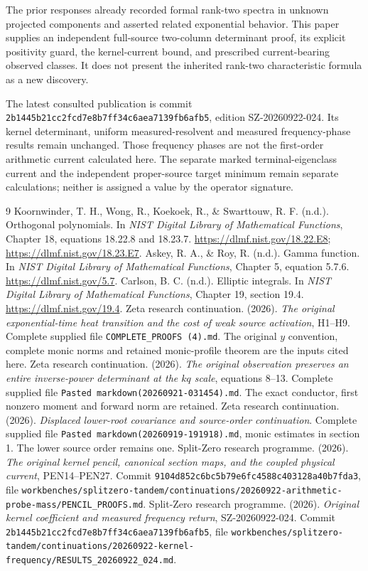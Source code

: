 \documentclass[11pt]{article}
\begin{document}
The prior responses already recorded formal rank-two spectra in unknown projected components and asserted related exponential behavior. This paper supplies an independent full-source two-column determinant proof, its explicit positivity guard, the kernel-current bound, and prescribed current-bearing observed classes. It does not present the inherited rank-two characteristic formula as a new discovery.

The latest consulted publication is commit \nolinkurl{2b1445b21cc2fcd7e8b7ff34c6aea7139fb6afb5}, edition SZ-20260922-024. Its kernel determinant, uniform measured-resolvent and measured frequency-phase results remain unchanged. Those frequency phases are not the first-order arithmetic current calculated here. The separate marked terminal-eigenclass current and the independent proper-source target minimum remain separate calculations; neither is assigned a value by the operator signature.

\begin{thebibliography}{9}
 Koornwinder, T. H., Wong, R., Koekoek, R., \& Swarttouw, R. F. (n.d.). Orthogonal polynomials. In \emph{NIST Digital Library of Mathematical Functions}, Chapter 18, equations 18.22.8 and 18.23.7. \url{https://dlmf.nist.gov/18.22.E8}; \url{https://dlmf.nist.gov/18.23.E7}.
 Askey, R. A., \& Roy, R. (n.d.). Gamma function. In \emph{NIST Digital Library of Mathematical Functions}, Chapter 5, equation 5.7.6. \url{https://dlmf.nist.gov/5.7}.
 Carlson, B. C. (n.d.). Elliptic integrals. In \emph{NIST Digital Library of Mathematical Functions}, Chapter 19, section 19.4. \url{https://dlmf.nist.gov/19.4}.
 Zeta research continuation. (2026). \emph{The original exponential-time heat transition and the cost of weak source activation}, H1--H9. Complete supplied file \nolinkurl{COMPLETE_PROOFS (4).md}. The original $y$ convention, complete monic norms and retained monic-profile theorem are the inputs cited here.
 Zeta research continuation. (2026). \emph{The original observation preserves an entire inverse-power determinant at the $kq$ scale}, equations 8--13. Complete supplied file \nolinkurl{Pasted markdown(20260921-031454).md}. The exact conductor, first nonzero moment and forward norm are retained.
 Zeta research continuation. (2026). \emph{Displaced lower-root covariance and source-order continuation}. Complete supplied file \nolinkurl{Pasted markdown(20260919-191918).md}, monic estimates in section 1. The lower source order remains one.
 Split-Zero research programme. (2026). \emph{The original kernel pencil, canonical section maps, and the coupled physical current}, PEN14--PEN27. Commit \nolinkurl{9104d852c6bc5b79e6fc4588c403128a40b7fda3}, file \nolinkurl{workbenches/splitzero-tandem/continuations/20260922-arithmetic-probe-mass/PENCIL_PROOFS.md}.
 Split-Zero research programme. (2026). \emph{Original kernel coefficient and measured frequency return}, SZ-20260922-024. Commit \nolinkurl{2b1445b21cc2fcd7e8b7ff34c6aea7139fb6afb5}, file \nolinkurl{workbenches/splitzero-tandem/continuations/20260922-kernel-frequency/RESULTS_20260922_024.md}.
\end{thebibliography}
\end{document}
